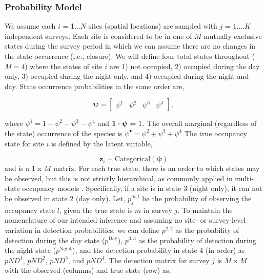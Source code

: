 \documentclass[12pt]{article}
\begin{document}
\subsubsection{Probability Model}
We assume each $i$ = 1...$N$ sites (spatial locations) are sampled with $j$ = 1....$K$ independent surveys. Each site is considered to be in one of $M$ mutually exclusive states during the survey period in which we can assume there are no changes in the state occurrence (i.e., closure). We will define four total states throughout ($M = 4$) where the states of site $i$ are 1) not occupied, 2) occupied during the day only, 3) occupied during the night only, and 4) occupied during the night and day. State occurrence probabilities in the same order are, 

\begin{equation}
\boldsymbol{\psi} = \begin{bmatrix} \psi^1 & \psi^2 & \psi^3 & \psi^4 \end{bmatrix}, %
\end{equation}

where  $\psi^{1} = 1 - \psi^{2} - \psi^{3} - \psi^{4}$ and $\boldmath{1} \cdot \boldsymbol{\psi} = \text{1}$. The overall marginal (regardless of the state) occurrence of the species is $\psi^{\bullet} = \psi^{2} + \psi^{3} + \psi^{4}$ The true occupancy state for site $i$ is defined by the latent variable,

\begin{equation}
\textbf{z}_{i} \sim \text{Categorical}(\boldsymbol{\psi})
\end{equation}
and is a 1 x $M$ matrix. For each true state, there is an order to which states may be observed, but this is not strictly hierarchical, as commonly applied in multi-state occupancy models \citep{nichols2007}. Specifically, if a site is in state 3 (night only), it can not be observed in state 2 (day only). Let,  $p^{m,l}_{j}$ be the probability of observing the occupancy state $l$, given the true state is $m$ in survey $j$. To maintain the nomenclature of our intended inference and assuming no site- or survey-level variation in detection probabilities, we can define $p^{2,2}$ as the probability of detection during the day state ($p^{\text{Day}}$), $p^{3,3}$ as the probability of detection during the night state ($p^{\text{Night}}$), and the detection probability in state 4 (in order) as $pND^{1}$, $pND^{2}$, $pND^{3}$, and $pND^{4}$. The detection matrix for survey $j$ is $M$ x $M$ with the observed (columns) and true state (row) as,
\end{document}
